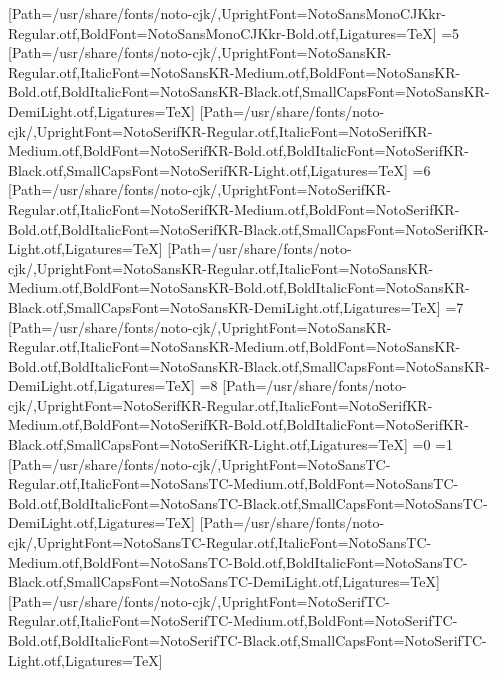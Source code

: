[Path=/usr/share/fonts/noto-cjk/,UprightFont=NotoSansMonoCJKkr-Regular.otf,BoldFont=NotoSansMonoCJKkr-Bold.otf,Ligatures=TeX]
\else\ifnum\value{CJKFonts}=5
[Path=/usr/share/fonts/noto-cjk/,UprightFont=NotoSansKR-Regular.otf,ItalicFont=NotoSansKR-Medium.otf,BoldFont=NotoSansKR-Bold.otf,BoldItalicFont=NotoSansKR-Black.otf,SmallCapsFont=NotoSansKR-DemiLight.otf,Ligatures=TeX]
[Path=/usr/share/fonts/noto-cjk/,UprightFont=NotoSerifKR-Regular.otf,ItalicFont=NotoSerifKR-Medium.otf,BoldFont=NotoSerifKR-Bold.otf,BoldItalicFont=NotoSerifKR-Black.otf,SmallCapsFont=NotoSerifKR-Light.otf,Ligatures=TeX]
\else\ifnum\value{CJKFonts}=6
[Path=/usr/share/fonts/noto-cjk/,UprightFont=NotoSerifKR-Regular.otf,ItalicFont=NotoSerifKR-Medium.otf,BoldFont=NotoSerifKR-Bold.otf,BoldItalicFont=NotoSerifKR-Black.otf,SmallCapsFont=NotoSerifKR-Light.otf,Ligatures=TeX]
[Path=/usr/share/fonts/noto-cjk/,UprightFont=NotoSansKR-Regular.otf,ItalicFont=NotoSansKR-Medium.otf,BoldFont=NotoSansKR-Bold.otf,BoldItalicFont=NotoSansKR-Black.otf,SmallCapsFont=NotoSansKR-DemiLight.otf,Ligatures=TeX]
\else\ifnum\value{CJKFonts}=7
[Path=/usr/share/fonts/noto-cjk/,UprightFont=NotoSansKR-Regular.otf,ItalicFont=NotoSansKR-Medium.otf,BoldFont=NotoSansKR-Bold.otf,BoldItalicFont=NotoSansKR-Black.otf,SmallCapsFont=NotoSansKR-DemiLight.otf,Ligatures=TeX]
\else\ifnum\value{CJKFonts}=8
[Path=/usr/share/fonts/noto-cjk/,UprightFont=NotoSerifKR-Regular.otf,ItalicFont=NotoSerifKR-Medium.otf,BoldFont=NotoSerifKR-Bold.otf,BoldItalicFont=NotoSerifKR-Black.otf,SmallCapsFont=NotoSerifKR-Light.otf,Ligatures=TeX]
\fi\fi\fi\fi\fi\fi\fi\fi\fi\fi\fi\fi\fi\fi
\ifnum\value{NotoCJKFamily}=0
\else\ifnum\value{NotoCJKFamily}=1
\newfontfamily{}[Path=/usr/share/fonts/noto-cjk/,UprightFont=NotoSansTC-Regular.otf,ItalicFont=NotoSansTC-Medium.otf,BoldFont=NotoSansTC-Bold.otf,BoldItalicFont=NotoSansTC-Black.otf,SmallCapsFont=NotoSansTC-DemiLight.otf,Ligatures=TeX]
\newfontfamily{}[Path=/usr/share/fonts/noto-cjk/,UprightFont=NotoSansTC-Regular.otf,ItalicFont=NotoSansTC-Medium.otf,BoldFont=NotoSansTC-Bold.otf,BoldItalicFont=NotoSansTC-Black.otf,SmallCapsFont=NotoSansTC-DemiLight.otf,Ligatures=TeX]
\newfontfamily{}[Path=/usr/share/fonts/noto-cjk/,UprightFont=NotoSerifTC-Regular.otf,ItalicFont=NotoSerifTC-Medium.otf,BoldFont=NotoSerifTC-Bold.otf,BoldItalicFont=NotoSerifTC-Black.otf,SmallCapsFont=NotoSerifTC-Light.otf,Ligatures=TeX]
